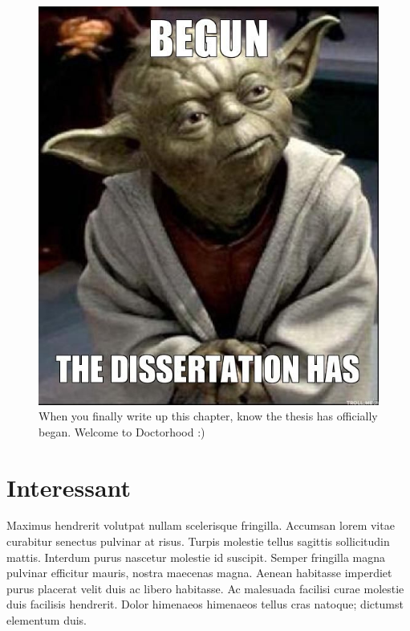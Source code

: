 \begin{figure}[!hbt]
    \centering
    \includegraphics[width=1\linewidth]{figures/chapter_1/start.jpg}
    \caption[When you finally write up this chapter seriously, know the thesis has officially began.]{When you finally write up this chapter, know the thesis has officially began. Welcome to Doctorhood :)}
    \label{fig:scientists-sigh}
\end{figure}

\section{Interessant}
Maximus hendrerit volutpat nullam scelerisque fringilla. Accumsan lorem vitae curabitur senectus pulvinar at risus. Turpis molestie tellus sagittis sollicitudin mattis. Interdum purus nascetur molestie id suscipit. Semper fringilla magna pulvinar efficitur mauris, nostra maecenas magna. Aenean habitasse imperdiet purus placerat velit duis ac libero habitasse. Ac malesuada facilisi curae molestie duis facilisis hendrerit. Dolor himenaeos himenaeos tellus cras natoque; dictumst elementum duis.

